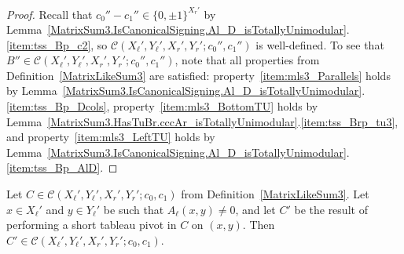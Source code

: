 \begin{proof}
    \leanok
    Recall that $c_{0}'' - c_{1}'' \in \{0, \pm 1\}^{X_{r}'}$ by Lemma~\ref{MatrixSum3.IsCanonicalSigning.Al_D_isTotallyUnimodular}.\ref{item:tss_Bp_c2}, so $\mathcal{C} (X_{\ell}', Y_{\ell}', X_{r}', Y_{r}'; c_{0}'', c_{1}'')$ is well-defined. To see that $B'' \in \mathcal{C} (X_{\ell}', Y_{\ell}', X_{r}', Y_{r}'; c_{0}'', c_{1}'')$, note that all properties from Definition~\ref{MatrixLikeSum3} are satisfied: property~\ref{item:mls3_Parallels} holds by Lemma~\ref{MatrixSum3.IsCanonicalSigning.Al_D_isTotallyUnimodular}.\ref{item:tss_Bp_Dcols}, property~\ref{item:mls3_BottomTU} holds by Lemma~\ref{MatrixSum3.HasTuBr.cccAr_isTotallyUnimodular}.\ref{item:tss_Brp_tu3}, and property~\ref{item:mls3_LeftTU} holds by Lemma~\ref{MatrixSum3.IsCanonicalSigning.Al_D_isTotallyUnimodular}.\ref{item:tss_Bp_AlD}.
\end{proof}

\begin{lemma}
    \label{MatrixLikeSum3.shortTableauPivot}
    \leanok
    Let $C \in \mathcal{C} (X_{\ell}', Y_{\ell}', X_{r}', Y_{r}'; c_{0}, c_{1})$ from Definition~\ref{MatrixLikeSum3}. Let $x \in X_{\ell}'$ and $y \in Y_{\ell}'$ be such that $A_{\ell} (x, y) \neq 0$, and let $C'$ be the result of performing a short tableau pivot in $C$ on $(x, y)$. Then $C' \in \mathcal{C} (X_{\ell}', Y_{\ell}', X_{r}', Y_{r}'; c_{0}, c_{1})$.
\end{lemma}

